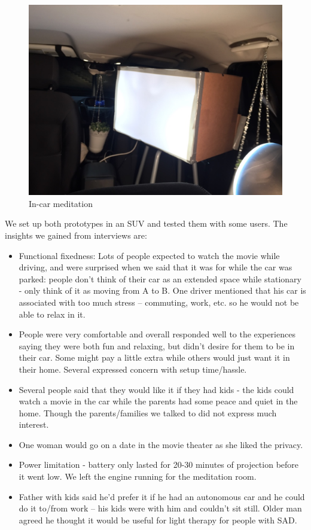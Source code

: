 \begin{figure}
\centering
\includegraphics[width=5in]{Figures/Prototypes/DarkHorse/DarkHorseMeditation2.png}
	\caption{In-car meditation}
		\label{fig:DarkHorseMeditation2}
\end{figure}

We set up both prototypes in an SUV and tested them with some users. The insights we gained from interviews are:

\begin{itemize}
    \item Functional fixedness: Lots of people expected to watch the movie while driving, and were surprised when we said that it was for while the car was parked: people don't think of their car as an extended space while stationary - only think of it as moving from A to B. One driver mentioned that his car is associated with too much stress – commuting, work, etc. so he would not be able to relax in it.
    \item People were very comfortable and overall responded well to the experiences saying they were both fun and relaxing, but didn’t desire for them to be in their car. Some might pay a little extra while others would just want it in their home. Several expressed concern with setup time/hassle. 
    \item Several people said that they would like it if they had kids - the kids could watch a movie in the car while the parents had some peace and quiet in the home. Though the parents/families we talked to did not express much interest.
    \item One woman would go on a date in the movie theater as she liked the privacy.
    \item Power limitation - battery only lasted for 20-30 minutes of projection before it went low. We left the engine running for the meditation room. 
    \item Father with kids said he'd prefer it if he had an autonomous car and he could do it to/from work – his kids were with him and couldn’t sit still. Older man agreed he thought it would be useful for light therapy for people with SAD.

\end{itemize}

